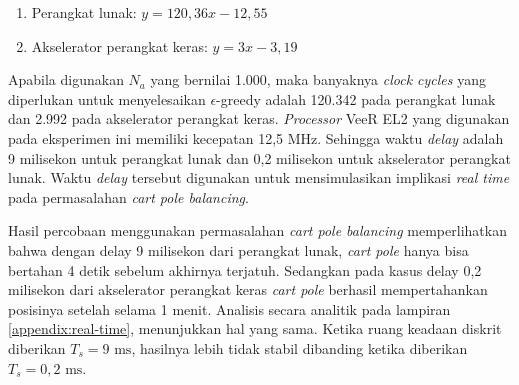 \begin{enumerate}
	\item Perangkat lunak: $y = 120,36x - 12,55$
	\item Akselerator perangkat keras: $y = 3x - 3,19$
\end{enumerate}

Apabila digunakan $N_a$ yang bernilai 1.000, maka banyaknya \textit{clock cycles} yang diperlukan untuk menyelesaikan $\epsilon$-greedy adalah 120.342 pada perangkat lunak dan 2.992 pada akselerator perangkat keras. \textit{Processor} VeeR EL2 yang digunakan pada eksperimen ini memiliki kecepatan 12,5 MHz. Sehingga waktu \textit{delay} adalah 9 milisekon untuk perangkat lunak dan 0,2 milisekon untuk akselerator perangkat lunak. Waktu \textit{delay} tersebut digunakan untuk mensimulasikan implikasi \textit{real time} pada permasalahan \textit{cart pole balancing}.

Hasil percobaan menggunakan permasalahan \textit{cart pole balancing} memperlihatkan bahwa dengan delay 9 milisekon dari perangkat lunak, \textit{cart pole} hanya bisa bertahan 4 detik sebelum akhirnya terjatuh. Sedangkan pada kasus delay 0,2 milisekon dari akselerator perangkat keras \textit{cart pole} berhasil mempertahankan posisinya setelah selama 1 menit. Analisis secara analitik pada lampiran \ref{appendix:real-time}, menunjukkan hal yang sama. Ketika ruang keadaan diskrit diberikan $T_s = 9 \text{ ms}$, hasilnya lebih tidak stabil dibanding ketika diberikan $T_s = 0,2 \text{ ms}$.
